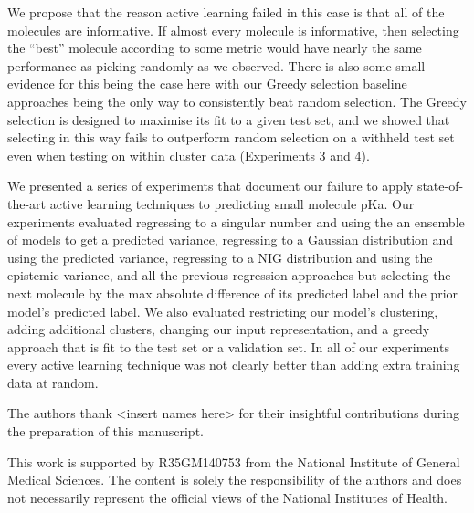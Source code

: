 \documentclass[journal=jmcmar,manuscript=article]{achemso}
\begin{document}
We propose that the reason active learning failed in this case is that all of the molecules are informative. If almost every molecule is informative, then selecting the ``best'' molecule according to some metric would have nearly the same performance as picking randomly as we observed. There is also some small evidence for this being the case here with our Greedy selection baseline approaches being the only way to consistently beat random selection. The Greedy selection is designed to maximise its fit to a given test set, and we showed that selecting in this way fails to outperform random selection on a withheld test set even when testing on within cluster data (Experiments 3 and 4). 

We presented a series of experiments that document our failure to apply state-of-the-art active learning techniques to predicting small molecule pKa. Our experiments evaluated regressing to a singular number and using the an ensemble of models to get a predicted variance, regressing to a Gaussian distribution and using the predicted variance, regressing to a NIG distribution and using the epistemic variance, and all the previous regression approaches but selecting the next molecule by the max absolute difference of its predicted label and the prior model's predicted label. We also evaluated restricting our model's clustering, adding additional clusters, changing our input representation, and a greedy approach that is fit to the test set or a validation set. In all of our experiments every active learning technique was not clearly better than adding extra training data at random. 

\begin{acknowledgement}


The authors thank <insert names here> for their insightful contributions during the preparation of this manuscript.

This work is supported by R35GM140753 from the National Institute of General Medical Sciences. The content is solely the responsibility of the authors and does not necessarily represent the official views of the National Institutes of Health.

\end{acknowledgement}
\end{document}
